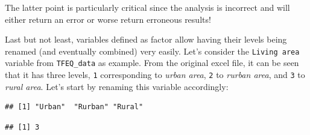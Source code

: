 \documentclass[
]{book}
\newenvironment{Shaded}{\begin{snugshade}}{\end{snugshade}}
\newcommand{\AttributeTok}[1]{\textcolor[rgb]{0.77,0.63,0.00}{#1}}
\newcommand{\DecValTok}[1]{\textcolor[rgb]{0.00,0.00,0.81}{#1}}
\newcommand{\FunctionTok}[1]{\textcolor[rgb]{0.00,0.00,0.00}{#1}}
\newcommand{\NormalTok}[1]{#1}
\newcommand{\OtherTok}[1]{\textcolor[rgb]{0.56,0.35,0.01}{#1}}
\newcommand{\SpecialCharTok}[1]{\textcolor[rgb]{0.00,0.00,0.00}{#1}}
\newcommand{\StringTok}[1]{\textcolor[rgb]{0.31,0.60,0.02}{#1}}
\begin{document}
The latter point is particularly critical since the analysis is incorrect and will either return an error or worse return erroneous results!

Last but not least, variables defined as factor allow having their levels being renamed (and eventually combined) very easily.
Let's consider the \texttt{Living\ area} variable from \texttt{TFEQ\_data} as example. From the original excel file, it can be seen that it has three levels, \texttt{1} corresponding to \emph{urban area}, \texttt{2} to \emph{rurban area}, and \texttt{3} to \emph{rural area}.
Let's start by renaming this variable accordingly:

\begin{Shaded}
\end{Shaded}

\begin{verbatim}
## [1] "Urban"  "Rurban" "Rural"
\end{verbatim}

\begin{Shaded}
\end{Shaded}

\begin{verbatim}
## [1] 3
\end{verbatim}

\begin{Shaded}
\end{Shaded}
\end{document}
